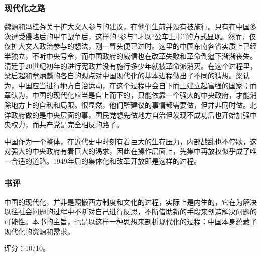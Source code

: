 \subsubsection{现代化之路}
魏源和冯桂芬关于扩大文人参与的建议，在他们生前并没有被施行。只有在中国多次遭受侵略后的甲午战争后，这样的“参与”才以“公车上书”的方式显现。然而，仅仅扩大文人政治参与的想法，刚一冒头便已过时。这里的中国东南各省实质上已经半独立，不听中央号令，而中国政府的威信也在改革失败和革命倒逼下渐渐丧失。清廷于20世纪初年的进行宪政并没有施行多少年就被革命派消灭。在这个过程里，梁启超和章炳麟的各自的观点对中国现代化的基本进程做出了不同的猜想。梁认为，中国应当进行地方自治运动，在这个过程中会自下而上建立起富强的国家；而章认为，中国的现代化应当是自上而下的，只能依靠一个强大的中央政府，才能消除地方上的自私和局限。很显然，他们所建议的事情都需要做，但并非同时做。北洋政府做的是中央层面的事，国民党想先做地方自治但发现不成功后也开始加强中央权力，而共产党是完全相反的路子。

中国作为一个整体，在近代史中时刻有着巨大的生存压力，内部战乱也不停歇，这对强大的中央政府有着巨大的渴求，因此在操作层面上，先集中再放权似乎成了唯一合适的道路。1949年后的集体化和改革开放即是这样的过程。

\subsubsection{书评}

中国的现代化，并非是照搬西方制度和文化的过程，实际上是内生的，它在为解决以往社会问题的过程中不断对自己进行反思，不断借助新的手段来创造解决问题的可能性。本书的主旨，也是以这样一种思想来剖析现代化的过程：中国本身蕴藏了现代化的资源和需求。

评分：10/10。